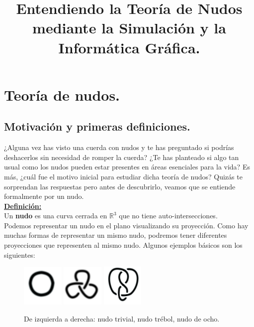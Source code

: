 \documentclass[14pt]{extarticle}
\title{Entendiendo la Teoría de Nudos mediante la Simulación y la Informática Gráfica.}
\begin{document}
\newtheorem{teo}{Teorema}[section]

\maketitle

\tableofcontents

\newpage
\section{Teoría de nudos. }\label{PrimerTema}

\subsection{Motivación y primeras definiciones.}
  ¿Alguna vez has visto una cuerda con nudos y te has preguntado si podrías deshacerlos sin necesidad de romper la cuerda? ¿Te has planteado si algo tan usual como los nudos pueden estar presentes en áreas esenciales para la vida? Es más, ¿cuál fue el motivo inicial para estudiar dicha teoría de nudos? Quizás te sorprendan las respuestas pero antes de descubrirlo, veamos que se entiende formalmente por un nudo.\\
  
\underline{\textbf{Definición:}}\\
 Un \textbf{nudo} es una curva cerrada en $\mathds{R}^{3}$ que no tiene auto-intersecciones.\\

Podemos representar un nudo en el plano visualizando su proyección. Como hay muchas formas de representar un mismo nudo, podremos tener diferentes proyecciones que representen al mismo nudo. 
 Algunos ejemplos básicos son los siguientes:
 
  \begin{figure}[h!]
  	\includegraphics[width=2cm]{1.jpg}
  	\includegraphics[width=2cm]{3f.png} 
  	\includegraphics[width=2cm]{fig8.jpg}
  	\centering
  	\caption{De izquierda a derecha: nudo trivial, nudo trébol, nudo de ocho.}
  	\label{uno} 
  \end{figure}
  
\end{document}

